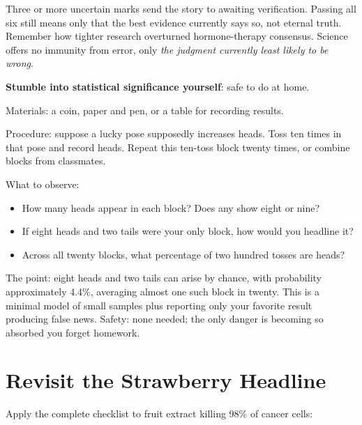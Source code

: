 Three or more uncertain marks send the story to awaiting verification. Passing all six still means only that the best evidence currently says so, not eternal truth. Remember how tighter research overturned hormone-therapy consensus. Science offers no immunity from error, only \emph{the judgment currently least likely to be wrong}.

\begin{shiyan}
\textbf{Stumble into statistical significance yourself}: safe to do at home.

Materials: a coin, paper and pen, or a table for recording results.

Procedure: suppose a lucky pose supposedly increases heads. Toss ten times in that pose and record heads. Repeat this ten-toss block twenty times, or combine blocks from classmates.

What to observe:
\begin{itemize}[itemsep=1pt]
\item How many heads appear in each block? Does any show eight or nine?
\item If eight heads and two tails were your only block, how would you headline it?
\item Across all twenty blocks, what percentage of two hundred tosses are heads?
\end{itemize}

The point: eight heads and two tails can arise by chance, with probability approximately 4.4\%, averaging almost one such block in twenty. This is a minimal model of small samples plus reporting only your favorite result producing false news. Safety: none needed; the only danger is becoming so absorbed you forget homework.
\end{shiyan}

\section{Revisit the Strawberry Headline}

Apply the complete checklist to fruit extract killing 98\% of cancer cells:

